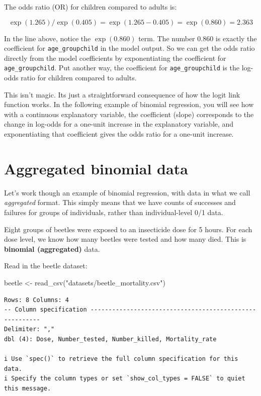 \documentclass[
  letterpaper,
  8pt,
  a4paper]{book}
\newenvironment{Shaded}{\begin{snugshade}}{\end{snugshade}}
\newcommand{\FunctionTok}[1]{\textcolor[rgb]{0.28,0.35,0.67}{#1}}
\newcommand{\NormalTok}[1]{\textcolor[rgb]{0.00,0.23,0.31}{#1}}
\newcommand{\OtherTok}[1]{\textcolor[rgb]{0.00,0.23,0.31}{#1}}
\newcommand{\StringTok}[1]{\textcolor[rgb]{0.13,0.47,0.30}{#1}}
\begin{document}
The odds ratio (OR) for children compared to adults is:

\[\exp(1.265) / \exp(0.405) = \exp(1.265 - 0.405) = \exp(0.860) = 2.363\]

In the line above, notice the \(\exp(0.860)\) term. The number 0.860 is
exactly the coefficient for \texttt{age\_groupchild} in the model
output. So we can get the odds ratio directly from the model
coefficients by exponentiating the coefficient for
\texttt{age\_groupchild}. Put another way, the coefficient for
\texttt{age\_groupchild} is the log-odds ratio for children compared to
adults.

This isn't magic. Its just a straightforward consequence of how the
logit link function works. In the following example of binomial
regression, you will see how with a continuous explanatory variable, the
coefficient (slope) corresponds to the change in log-odds for a one-unit
increase in the explanatory variable, and exponentiating that
coefficient gives the odds ratio for a one-unit increase.

\section*{Aggregated binomial data}\label{aggregated-binomial-data}


Let's work though an example of binomial regression, with data in what
we call \emph{aggregated} format. This simply means that we have counts
of successes and failures for groups of individuals, rather than
individual-level 0/1 data.

Eight groups of beetles were exposed to an insecticide dose for 5 hours.
For each dose level, we know how many beetles were tested and how many
died. This is \textbf{binomial (aggregated)} data.

Read in the beetle dataset:

\begin{Shaded}
\begin{Highlighting}[]
\NormalTok{beetle }\OtherTok{\textless{}{-}} \FunctionTok{read\_csv}\NormalTok{(}\StringTok{"datasets/beetle\_mortality.csv"}\NormalTok{)}
\end{Highlighting}
\end{Shaded}

\begin{verbatim}
Rows: 8 Columns: 4
-- Column specification --------------------------------------------------------
Delimiter: ","
dbl (4): Dose, Number_tested, Number_killed, Mortality_rate

i Use `spec()` to retrieve the full column specification for this data.
i Specify the column types or set `show_col_types = FALSE` to quiet this message.
\end{verbatim}
\end{document}
